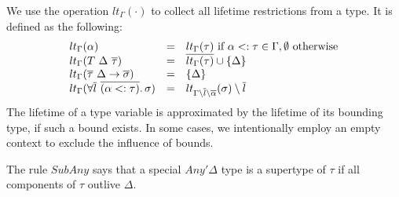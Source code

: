 \documentclass[11pt]{article}
\newcommand{\ap}{~}
\begin{document}
    We use the operation $lt_\Gamma(\cdot)$ to collect all lifetime restrictions from a type.
    It is defined as the following:
    \[
        \begin{array}{lll}
            lt_\Gamma(\alpha)                                     & = & lt_\Gamma(\tau) \text{ if } \alpha <: \tau \in \Gamma, \emptyset \text{ otherwise} \\
            lt_\Gamma(T\ap\Delta\ap\overline{\tau})               & = & \overline{lt_\Gamma(\tau)} \cup \{\Delta\}                                         \\
            lt_\Gamma(\overline{\tau}~\Delta\to\overline{\sigma}) & = & \{\Delta\} \\
            lt_{\Gamma}(\forall \overline{l}~\overline{(\alpha <: \tau)}\ldotp\sigma) & = & lt_{\Gamma\setminus\overline{l}\setminus\overline{\alpha}}(\sigma) \setminus \overline{l}
        \end{array}
    \]
    The lifetime of a type variable is approximated by the lifetime of its bounding type, if such a bound exists.
    In some cases, we intentionally employ an empty context to exclude the influence of bounds.

    The rule $SubAny$ says that a special $Any'\Delta$ type is a supertype of $\tau$ if all components of $\tau$ outlive $\Delta$.

\end{document}
